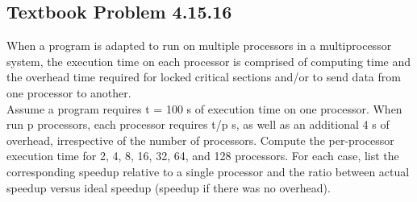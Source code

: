 \documentclass[12pt]{article}
\begin{document}
\subsection{Textbook Problem 4.15.16}
When a program is adapted to run on multiple processors in a multiprocessor system, the execution time on each processor is comprised of computing time and the overhead time required for locked critical sections and/or to send data from one processor to another.
\\
Assume a program requires t = 100 s of execution time on one processor. When run p processors, each processor requires t/p s, as well as an additional 4 s of overhead, irrespective of the number of processors. Compute the per-processor execution time for 2, 4, 8, 16, 32, 64, and 128 processors. For each case, list the corresponding speedup relative to a single processor and the ratio between actual speedup versus ideal speedup (speedup if there was no overhead).
\end{document}
